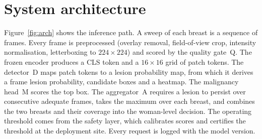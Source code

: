 \section{System architecture}\label{sec:arch}
Figure~\ref{fig:arch} shows the inference path. A sweep of each breast is a sequence of frames. Every frame is preprocessed (overlay removal, field-of-view crop, intensity normalisation, letterboxing to $224\times224$) and scored by the quality gate~Q. The frozen encoder produces a CLS token and a $16\times16$ grid of patch tokens. The detector~D maps patch tokens to a lesion probability map, from which it derives a frame lesion probability, candidate boxes and a heatmap. The malignancy head~M scores the top box. The aggregator~A requires a lesion to persist over consecutive adequate frames, takes the maximum over each breast, and combines the two breasts and their coverage into the woman-level decision. The operating threshold comes from the safety layer, which calibrates scores and certifies the threshold at the deployment site. Every request is logged with the model version.

